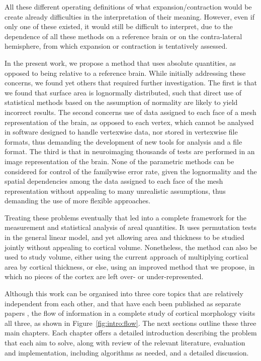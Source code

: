 All these different operating definitions of what expansion/contraction would be create already difficulties in the interpretation of their meaning. However, even if only one of these existed, it would still be difficult to interpret, due to the dependence of all these methods on a reference brain or on the contra-lateral hemisphere, from which expansion or contraction is tentatively assessed.

In the present work, we propose a method that uses absolute quantities, as opposed to being relative to a reference brain. While initially addressing these concerns, we found yet others that required further investigation. The first is that we found that surface area is lognormally distributed, such that direct use of statistical methods based on the assumption of normality are likely to yield incorrect results. The second concerns use of data assigned to each face of a mesh representation of the brain, as opposed to each vertex, which cannot be analysed in software designed to handle vertexwise data, nor stored in vertexwise file formats, thus demanding the development of new tools for analysis and a file format. The third is that in neuroimaging thousands of tests are performed in an image representation of the brain. None of the parametric methods can be considered for control of the familywise error rate, given the lognormality and the spatial dependencies among the data assigned to each face of the mesh representation without appealing to many unrealistic assumptions, thus demanding the use of more flexible approaches.

Treating these problems eventually that led into a complete framework for the measurement and statistical analysis of areal quantities. It uses permutation tests in the general linear model, and yet allowing area and thickness to be studied jointly without appealing to cortical volume. Nonetheless, the method can also be used to study volume, either using the current approach of multiplying cortical area by cortical thickness, or else, using an improved method that we propose, in which no pieces of the cortex are left over- or under-represented.

Although this work can be organised into three core topics that are relatively independent from each other, and that have each been published as separate papers \citep{Winkler2012, Winkler2014, Winkler2016}, the flow of information in a complete study of cortical morphology visits all three, as shown in Figure~\ref{fig:intro:flow}. The next sections outline these three main chapters. Each chapter offers a detailed introduction describing the problem that each aim to solve, along with review of the relevant literature, evaluation and implementation, including algorithms as needed, and a detailed discussion.

